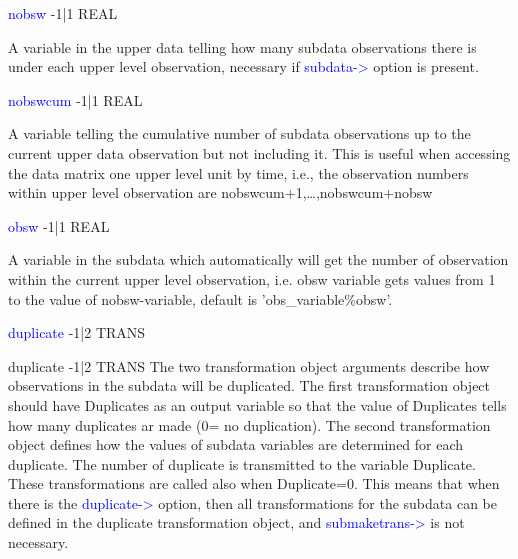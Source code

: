 \noindent \textcolor{blue}{nobsw}  \tabto{3cm}  -1|1  \tabto{5cm}  REAL \tabto{7cm}
\begin{changemargin}{3cm}{0cm}
\noindent  A variable in the upper data telling how many subdata observations there is under
each upper level observation, necessary if \textcolor{blue}{subdata->} option is present.
\end{changemargin}
\vspace{0.3cm}
\hline
\vspace{0.3cm}
\noindent \textcolor{blue}{nobswcum} \tabto{3cm} -1|1 \tabto{5cm}  REAL \tabto{7cm}
\begin{changemargin}{3cm}{0cm}
\noindent  A variable telling the cumulative number of subdata observations up to the
current upper data observation but not including it. This is useful when accessing
the data matrix one upper level unit by time, i.e., the observation numbers within
upper level observation are nobswcum+1,…,nobswcum+nobsw
\end{changemargin}
\vspace{0.3cm}
\hline
\vspace{0.3cm}
\noindent \textcolor{blue}{obsw} \tabto{3cm} -1|1 \tabto{5cm}   REAL  \tabto{7cm}
\begin{changemargin}{3cm}{0cm}
\noindent  A variable in the subdata which automatically will get the number of observation
within the current upper level observation, i.e. obsw variable gets values from 1
to the value of nobsw-variable, default is 'obs\_variable\%obsw'.
\end{changemargin}
\vspace{0.3cm}
\hline
\vspace{0.3cm}
\noindent \textcolor{blue}{duplicate} \tabto{3cm} -1|2 \tabto{5cm}   TRANS  \tabto{7cm}
\begin{changemargin}{3cm}{0cm}
\noindent \noindent duplicate \tabto{3cm} -1|2 \tabto{5cm}   TRANS  \tabto{7cm}
The two transformation object arguments describe how observations in the subdata
will be duplicated. The first transformation object should have Duplicates as an
output variable so that the value of Duplicates tells how many duplicates ar
made (0= no duplication). The second transformation object defines how the values
of subdata variables are determined for each duplicate. The number of duplicate
is transmitted to the variable Duplicate. These transformations are called also
when Duplicate=0. This means that when there is the \textcolor{blue}{duplicate->} option,
then all transformations for the subdata can be defined in the duplicate
transformation object, and \textcolor{blue}{submaketrans->} is not necessary.
\end{changemargin}

